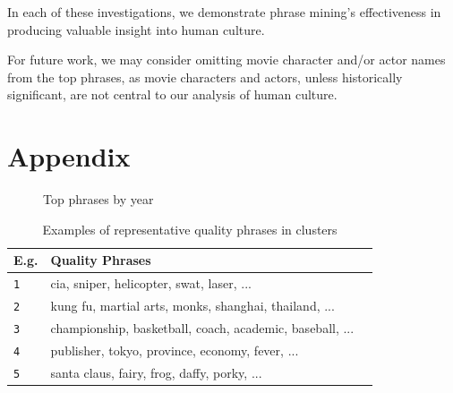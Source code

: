 \documentclass{article}
\begin{document}
\begin{multicols}{2}
In each of these investigations, we demonstrate phrase mining's effectiveness in producing valuable insight into human culture.

For future work, we may consider omitting movie character and/or actor names from the top phrases, as movie characters and actors, unless historically significant, are not central to our analysis of human culture.

\nocite{10.1145/2723372.2751523}


\section{Appendix} \label{appendix} %

\begin{figure}
\caption{Top phrases by year}
\centering
{}
\label{figure:top_phrases_by_year}
\end{figure}

\begin{figure}
\ContinuedFloat
\centering
{}
\end{figure}

\begin{table}
\caption{Examples of representative quality phrases in clusters}
\centering
\begin{tabularx}{.8\textwidth}{llX}
    \textbf{E.g.} & \textbf{Quality Phrases} \\
    \hline
    \texttt 1 & cia, sniper, helicopter, swat, laser, ...\\
    \texttt 2 & kung fu, martial arts, monks, shanghai, thailand, ...\\
    \texttt 3 & championship, basketball, coach, academic, baseball, ...\\
    \texttt 4 & publisher, tokyo, province, economy, fever, ...\\
    \texttt 5 & santa claus, fairy, frog, daffy, porky, ...\\
\end{tabularx}
\label{table:cluster_rep_quality_phrases}
\end{table}


\end{multicols}
\end{document}

